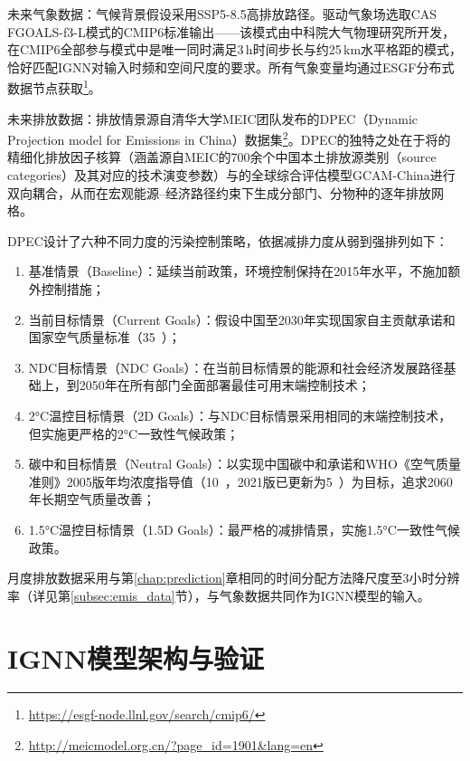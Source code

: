 未来气象数据：气候背景假设采用SSP5-8.5高排放路径。驱动气象场选取CAS FGOALS-f3-L模式\citep{bao2020cas}的CMIP6\citep{eyring2016overview}标准输出——该模式由中科院大气物理研究所开发，在CMIP6全部参与模式中是唯一同时满足3\,h时间步长与约25\,km水平格距的模式，恰好匹配IGNN对输入时频和空间尺度的要求。所有气象变量均通过ESGF分布式数据节点获取\footnote{\url{https://esgf-node.llnl.gov/search/cmip6/}}。

未来排放数据：排放情景源自清华大学MEIC团队发布的DPEC（Dynamic Projection model for Emissions in China）数据集\citep{tong2020dynamic,cheng2021pathways}\footnote{\url{http://meicmodel.org.cn/?page_id=1901&lang=en}}。DPEC的独特之处在于将的精细化排放因子核算（涵盖源自MEIC的700余个中国本土排放源类别（source categories）及其对应的技术演变参数）与的全球综合评估模型GCAM-China进行双向耦合，从而在宏观能源--经济路径约束下生成分部门、分物种的逐年排放网格。

DPEC设计了六种不同力度的污染控制策略，依据减排力度从弱到强排列如下：

\begin{enumerate}
    \item 基准情景（Baseline）：延续当前政策，环境控制保持在2015年水平，不施加额外控制措施；
    \item 当前目标情景（Current Goals）：假设中国至2030年实现国家自主贡献承诺和国家\PM 空气质量标准（35~\ug{}）；
    \item NDC目标情景（NDC Goals）：在当前目标情景的能源和社会经济发展路径基础上，到2050年在所有部门全面部署最佳可用末端控制技术；
    \item 2°C温控目标情景（2D Goals）：与NDC目标情景采用相同的末端控制技术，但实施更严格的2°C一致性气候政策；
    \item 碳中和目标情景（Neutral Goals）：以实现中国碳中和承诺和WHO《空气质量准则》2005版\PM 年均浓度指导值（10~\ug{}，2021版已更新为5~\ug{}）为目标，追求2060年长期空气质量改善；
    \item 1.5°C温控目标情景（1.5D Goals）：最严格的减排情景，实施1.5°C一致性气候政策。
\end{enumerate}

月度排放数据采用与第\ref{chap:prediction}章相同的时间分配方法降尺度至3小时分辨率（详见第\ref{subsec:emis_data}节），与气象数据共同作为IGNN模型的输入。


\section{IGNN模型架构与验证}
\label{sec:ignn_model}

